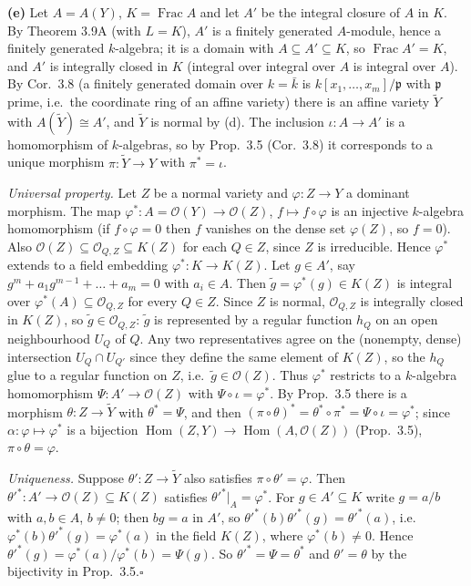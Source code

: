 \documentclass[11pt]{article}
\begin{document}
\textbf{(e)} Let $A=A(Y)$, $K=\operatorname{Frac}A$ and let $A'$ be the integral closure of $A$ in $K$. By Theorem 3.9A (with $L=K$), $A'$ is a finitely generated $A$-module, hence a finitely generated $k$-algebra; it is a domain with $A\subseteq A'\subseteq K$, so $\operatorname{Frac}A'=K$, and $A'$ is integrally closed in $K$ (integral over integral over $A$ is integral over $A$). By Cor.~3.8 (a finitely generated domain over $k=\bar k$ is $k[x_1,\dots,x_m]/\mathfrak p$ with $\mathfrak p$ prime, i.e.\ the coordinate ring of an affine variety) there is an affine variety $\tilde Y$ with $A(\tilde Y)\cong A'$, and $\tilde Y$ is normal by (d). The inclusion $\iota\colon A\to A'$ is a homomorphism of $k$-algebras, so by Prop.~3.5 (Cor.~3.8) it corresponds to a unique morphism $\pi\colon\tilde Y\to Y$ with $\pi^*=\iota$.

\emph{Universal property.} Let $Z$ be a normal variety and $\varphi\colon Z\to Y$ a dominant morphism. The map $\varphi^*\colon A=\mathcal{O}(Y)\to\mathcal{O}(Z)$, $f\mapsto f\circ\varphi$ is an injective $k$-algebra homomorphism (if $f\circ\varphi=0$ then $f$ vanishes on the dense set $\varphi(Z)$, so $f=0$). Also $\mathcal{O}(Z)\subseteq\mathcal{O}_{Q,Z}\subseteq K(Z)$ for each $Q\in Z$, since $Z$ is irreducible. Hence $\varphi^*$ extends to a field embedding $\varphi^*\colon K\to K(Z)$. Let $g\in A'$, say $g^m+a_1g^{m-1}+\dots+a_m=0$ with $a_i\in A$. Then $\tilde g=\varphi^*(g)\in K(Z)$ is integral over $\varphi^*(A)\subseteq\mathcal{O}_{Q,Z}$ for every $Q\in Z$. Since $Z$ is normal, $\mathcal{O}_{Q,Z}$ is integrally closed in $K(Z)$, so $\tilde g\in\mathcal{O}_{Q,Z}$: $\tilde g$ is represented by a regular function $h_Q$ on an open neighbourhood $U_Q$ of $Q$. Any two representatives agree on the (nonempty, dense) intersection $U_Q\cap U_{Q'}$ since they define the same element of $K(Z)$, so the $h_Q$ glue to a regular function on $Z$, i.e.\ $\tilde g\in\mathcal{O}(Z)$. Thus $\varphi^*$ restricts to a $k$-algebra homomorphism $\Psi\colon A'\to\mathcal{O}(Z)$ with $\Psi\circ\iota=\varphi^*$. By Prop.~3.5 there is a morphism $\theta\colon Z\to\tilde Y$ with $\theta^*=\Psi$, and then $(\pi\circ\theta)^*=\theta^*\circ\pi^*=\Psi\circ\iota=\varphi^*$; since $\alpha\colon\varphi\mapsto\varphi^*$ is a bijection $\operatorname{Hom}(Z,Y)\to\operatorname{Hom}(A,\mathcal{O}(Z))$ (Prop.~3.5), $\pi\circ\theta=\varphi$.

\emph{Uniqueness.} Suppose $\theta'\colon Z\to\tilde Y$ also satisfies $\pi\circ\theta'=\varphi$. Then $\theta'^*\colon A'\to\mathcal{O}(Z)\subseteq K(Z)$ satisfies $\theta'^*|_A=\varphi^*$. For $g\in A'\subseteq K$ write $g=a/b$ with $a,b\in A$, $b\ne0$; then $bg=a$ in $A'$, so $\theta'^*(b)\theta'^*(g)=\theta'^*(a)$, i.e.\ $\varphi^*(b)\theta'^*(g)=\varphi^*(a)$ in the field $K(Z)$, where $\varphi^*(b)\neq0$. Hence $\theta'^*(g)=\varphi^*(a)/\varphi^*(b)=\Psi(g)$. So $\theta'^*=\Psi=\theta^*$ and $\theta'=\theta$ by the bijectivity in Prop.~3.5.\hfill$\square$
\end{document}
